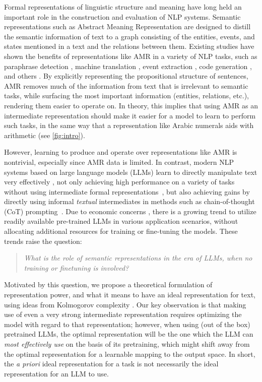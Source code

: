 Formal representations of linguistic structure and meaning have long held an important role in the construction and evaluation of NLP systems. Semantic representations such as Abstract Meaning Representation \citep[AMR;][]{banarescu2013abstract} are designed to distill the semantic information of text to a graph consisting of the entities, events, and states mentioned in a text and the relations between them.
Existing studies have shown the benefits of representations like AMR in a variety of NLP tasks, such as 
paraphrase detection \citep{Issa2018Abstract},
machine translation \citep{song2019semantic}, event extraction \citep{Garg2015Extracting,huang2018zero}, code generation \citep{yin2017syntactic}, 
and others \citep{Dohare2017Text,jangra2022star,wolfson2020break,kapanipathi2021leveraging}.
By explicitly representing the propositional structure of sentences, AMR removes much of the information from text that is irrelevant to semantic tasks, while surfacing the most important information (entities, relations, etc.), rendering them easier to operate on. In theory, this implies that using AMR as an intermediate representation should make it easier for a model to learn to perform such tasks, in the same way that a representation like Arabic numerals aids with arithmetic (see \cref{fig:intro}).


However, learning to produce and operate over representations like AMR is nontrivial, especially since AMR data is limited.
In contrast, modern NLP systems based on large language models (LLMs) learn to directly manipulate text very effectively \cite{ignat-etal-2024-has},
not only achieving high performance on a variety of tasks without using intermediate formal representations~\citep{brown2020gpt3},
but also achieving gains by directly using informal \textit{textual} intermediates in methods such as chain-of-thought (CoT) prompting~\citep{wei2022chain}.
Due to economic concerns \citep{zhao2022greener,samsi2023words,patterson2021carbon,sharir2020cost},
there is a growing trend to utilize readily available pre-trained LLMs in various application scenarios, without allocating additional resources for training or fine-tuning the models.
These trends raise the question:
\begin{quote}
    \textit{What is the role of semantic representations in the era of LLMs, when no training or finetuning is involved?}
\end{quote} 

Motivated by this question, we propose a theoretical formulation of representation power, and what it means to have an ideal representation for text, using ideas from Kolmogorov complexity \cite{solomonoff1964formal,kolmogorov1965three}. Our key observation is that making use of even a very strong intermediate representation requires optimizing the model with regard to that representation; however, when using (out of the box) pretrained LLMs, the optimal representation will be the one which the LLM can \textit{most effectively use} on the basis of its pretraining, which might shift away from the optimal representation for a learnable mapping to the output space.
In short, the \textit{a priori} ideal representation for a task is not necessarily the ideal representation for an LLM to use.

